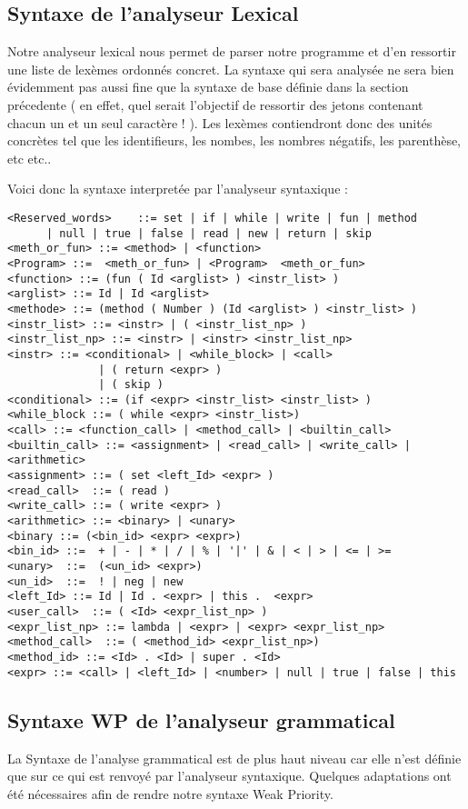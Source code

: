 \subsection{Syntaxe de l'analyseur Lexical}

Notre analyseur lexical nous permet de parser notre programme et d'en ressortir une liste de lexèmes ordonnés concret. 
La syntaxe qui sera analysée ne sera bien évidemment pas aussi fine que la syntaxe de base définie dans la section précedente 
( en effet, quel serait l'objectif de ressortir des jetons contenant chacun un et un seul caractère ! ). 
Les lexèmes contiendront donc des unités concrètes tel que les identifieurs, les nombes, les nombres négatifs, les parenthèse, etc etc..

Voici donc la syntaxe interpretée par l'analyseur syntaxique :

\begin{verbatim}
<Reserved_words>    ::= set | if | while | write | fun | method 
      | null | true | false | read | new | return | skip
<meth_or_fun> ::= <method> | <function>
<Program> ::=  <meth_or_fun> | <Program>  <meth_or_fun>
<function> ::= (fun ( Id <arglist> ) <instr_list> ) 
<arglist> ::= Id | Id <arglist>
<methode> ::= (method ( Number ) (Id <arglist> ) <instr_list> )
<instr_list> ::= <instr> | ( <instr_list_np> ) 
<instr_list_np> ::= <instr> | <instr> <instr_list_np>
<instr> ::= <conditional> | <while_block> | <call> 
			  | ( return <expr> ) 
			  | ( skip )
<conditional> ::= (if <expr> <instr_list> <instr_list> ) 
<while_block ::= ( while <expr> <instr_list>) 
<call> ::= <function_call> | <method_call> | <builtin_call> 
<builtin_call> ::= <assignment> | <read_call> | <write_call> | <arithmetic>
<assignment> ::= ( set <left_Id> <expr> ) 
<read_call>  ::= ( read ) 
<write_call> ::= ( write <expr> )
<arithmetic> ::= <binary> | <unary>
<binary ::= (<bin_id> <expr> <expr>)
<bin_id> ::=  + | - | * | / | % | '|' | & | < | > | <= | >=
<unary>  ::=  (<un_id> <expr>)
<un_id>  ::=  ! | neg | new
<left_Id> ::= Id | Id . <expr> | this .  <expr>
<user_call>  ::= ( <Id> <expr_list_np> )
<expr_list_np> ::= lambda | <expr> | <expr> <expr_list_np>
<method_call>  ::= ( <method_id> <expr_list_np>)
<method_id> ::= <Id> . <Id> | super . <Id> 
<expr> ::= <call> | <left_Id> | <number> | null | true | false | this  
\end{verbatim}


\subsection{Syntaxe WP de l'analyseur grammatical}
La Syntaxe de l'analyse grammatical est de plus haut niveau car elle n'est définie que sur ce qui
est renvoyé par l'analyseur syntaxique. Quelques adaptations ont été nécessaires afin de rendre
notre syntaxe Weak Priority. 

